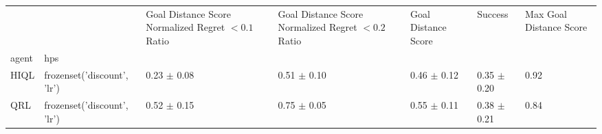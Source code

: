 \begin{tabular}{lllllll}
\toprule
 &  & Goal Distance Score Normalized Regret $< 0.1$ Ratio & Goal Distance Score Normalized Regret $< 0.2$ Ratio & Goal Distance Score & Success & Max Goal Distance Score \\
agent & hps &  &  &  &  &  \\
\midrule
HIQL & frozenset({'discount', 'lr'}) & 0.23 $\pm$ 0.08 & 0.51 $\pm$ 0.10 & 0.46 $\pm$ 0.12 & 0.35 $\pm$ 0.20 & 0.92 \\
\cline{1-7}
QRL & frozenset({'discount', 'lr'}) & 0.52 $\pm$ 0.15 & 0.75 $\pm$ 0.05 & 0.55 $\pm$ 0.11 & 0.38 $\pm$ 0.21 & 0.84 \\
\cline{1-7}
\bottomrule
\end{tabular}
